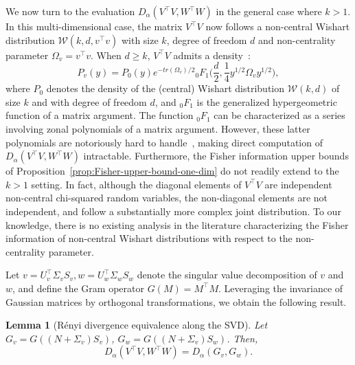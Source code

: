 \documentclass{article}
\theoremstyle{plain}
\newtheorem{lemma}{Lemma}[section]
\theoremstyle{definition}
\theoremstyle{remark}
\begin{document}
We now turn to the evaluation $D_\alpha(V^\top V, W^\top W)$ in the general case where $k>1$. In this multi-dimensional case, the matrix $V^\top V$ now follows a non-central Wishart distribution $\mathcal{W}(k,d,v^\top v)$ with size $k$, degree of freedom $d$ and non-centrality parameter $\Omega_v = v^\top v$. When $d \geq k$, $V^\top V$ admits a density~\citep{Muirhead2009}:
\[P_v(y) =  P_0(y) e^{-tr(\Omega_v)/2} {}_0F_1\Big(\frac{d}{2}, \frac{1}{4}y^{1/2} \Omega_v y^{1/2} \Big),\]
where $P_0$ denotes the density of the (central) Wishart distribution $\mathcal{W}(k,d)$ of size $k$ and with degree of freedom $d$, and ${}_0F_1$ is the generalized hypergeometric function of a matrix argument. The function ${}_0F_1$ can be characterized as a series involving zonal polynomials of a matrix argument. However, these latter polynomials are notoriously hard to handle~\citep{Koev2006}, making direct computation of $D_\alpha(V^\top V,W^\top W)$ intractable.
Furthermore, the Fisher information upper bounds of Proposition~\ref{prop:Fisher-upper-bound-one-dim} do not readily extend to the $k>1$ setting. In fact, although the diagonal elements of $V^\top V$ are independent non-central chi-squared random variables, the non-diagonal elements are not independent, and follow a substantially more complex joint distribution. To our knowledge, there is no existing analysis in the literature characterizing the Fisher information of non-central Wishart distributions with respect to the non-centrality parameter.

Let $v = U_v^\top \Sigma_v S_v, w = U_w^\top \Sigma_w S_w$ denote the singular value decomposition of $v$ and $w$, and define the Gram operator $G(M) = M^\top M$. Leveraging the invariance of Gaussian matrices by orthogonal transformations, we obtain the following result.

\begin{lemma}[Rényi divergence equivalence along the SVD]
Let $G_v = G((N+\Sigma_v)S_v)$, $G_w = G((N+\Sigma_v)S_w)$. Then,
\[D_\alpha(V^\top V, W^\top W) = D_\alpha (G_v,G_w).\]
\end{lemma}
\end{document}
